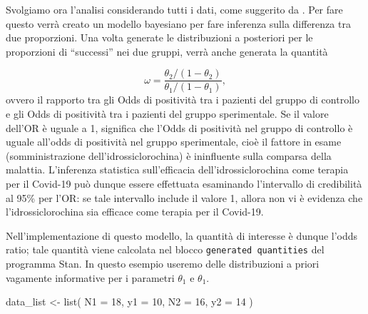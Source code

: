 \documentclass[
]{memoir}
\newenvironment{Shaded}{\begin{snugshade}}{\end{snugshade}}
\newcommand{\AttributeTok}[1]{\textcolor[rgb]{0.77,0.63,0.00}{#1}}
\newcommand{\DecValTok}[1]{\textcolor[rgb]{0.00,0.00,0.81}{#1}}
\newcommand{\FunctionTok}[1]{\textcolor[rgb]{0.00,0.00,0.00}{#1}}
\newcommand{\NormalTok}[1]{#1}
\newcommand{\OtherTok}[1]{\textcolor[rgb]{0.56,0.35,0.01}{#1}}
\begin{document}
Svolgiamo ora l'analisi considerando tutti i dati, come suggerito da \citet{Hulme_2020}. Per fare questo verrà creato un modello bayesiano per fare inferenza sulla differenza tra due proporzioni. Una volta generate le distribuzioni a posteriori per le proporzioni di ``successi'' nei due gruppi, verrà anche generata la quantità

\[
\omega = \frac{\theta_2 / (1-\theta_2)}{\theta_1 / (1-\theta_1)},
\]
\noindent
ovvero il rapporto tra gli Odds di positività tra i pazienti del gruppo di controllo e gli Odds di positività tra i pazienti del gruppo sperimentale. Se il valore dell'OR è uguale a 1, significa che l'Odds di positività nel gruppo di controllo è uguale all'odds di positività nel gruppo sperimentale, cioè il fattore in esame (somministrazione dell'idrossiclorochina) è ininfluente sulla comparsa della malattia. L'inferenza statistica sull'efficacia dell'idrossiclorochina come terapia per il Covid-19 può dunque essere effettuata esaminando l'intervallo di credibilità al 95\% per l'OR: se tale intervallo include il valore 1, allora non vi è evidenza che l'idrossiclorochina sia efficace come terapia per il Covid-19.

Nell'implementazione di questo modello, la quantità di interesse è dunque l'odds ratio; tale quantità viene calcolata nel blocco \texttt{generated\ quantities} del programma Stan. In questo esempio useremo delle distribuzioni a priori vagamente informative per i parametri \(\theta_1\) e \(\theta_1\).

\begin{Shaded}
\begin{Highlighting}[]
\NormalTok{data\_list }\OtherTok{\textless{}{-}} \FunctionTok{list}\NormalTok{(}
  \AttributeTok{N1 =} \DecValTok{18}\NormalTok{, }
  \AttributeTok{y1 =} \DecValTok{10}\NormalTok{, }
  \AttributeTok{N2 =} \DecValTok{16}\NormalTok{, }
  \AttributeTok{y2 =} \DecValTok{14}
\NormalTok{)}
\end{Highlighting}
\end{Shaded}
\end{document}
